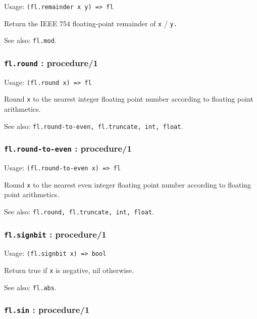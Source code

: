 \documentclass[
]{article}
\newcommand{\passthrough}[1]{#1}
\begin{document}
Usage: \passthrough{\lstinline!(fl.remainder x y) => fl!}

Return the IEEE 754 floating-point remainder of
\passthrough{\lstinline!x!} / \passthrough{\lstinline!y.!}

See also: \passthrough{\lstinline!fl.mod!}.

\hypertarget{fl.round-procedure1}{%
\subsubsection{\texorpdfstring{\texttt{fl.round} :
procedure/1}{fl.round : procedure/1}}\label{fl.round-procedure1}}

Usage: \passthrough{\lstinline!(fl.round x) => fl!}

Round \passthrough{\lstinline!x!} to the nearest integer floating point
number according to floating point arithmetics.

See also:
\passthrough{\lstinline!fl.round-to-even, fl.truncate, int, float!}.

\hypertarget{fl.round-to-even-procedure1}{%
\subsubsection{\texorpdfstring{\texttt{fl.round-to-even} :
procedure/1}{fl.round-to-even : procedure/1}}\label{fl.round-to-even-procedure1}}

Usage: \passthrough{\lstinline!(fl.round-to-even x) => fl!}

Round \passthrough{\lstinline!x!} to the nearest even integer floating
point number according to floating point arithmetics.

See also: \passthrough{\lstinline!fl.round, fl.truncate, int, float!}.

\hypertarget{fl.signbit-procedure1}{%
\subsubsection{\texorpdfstring{\texttt{fl.signbit} :
procedure/1}{fl.signbit : procedure/1}}\label{fl.signbit-procedure1}}

Usage: \passthrough{\lstinline!(fl.signbit x) => bool!}

Return true if \passthrough{\lstinline!x!} is negative, nil otherwise.

See also: \passthrough{\lstinline!fl.abs!}.

\hypertarget{fl.sin-procedure1}{%
\subsubsection{\texorpdfstring{\texttt{fl.sin} :
procedure/1}{fl.sin : procedure/1}}\label{fl.sin-procedure1}}
\end{document}
